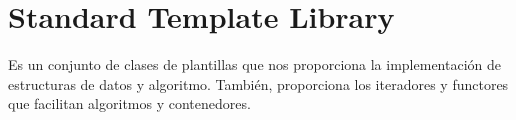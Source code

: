 \chapter{Standard Template Library}

Es un conjunto de clases de plantillas que nos proporciona la implementación de estructuras de datos y
algoritmo. También, proporciona los iteradores y functores que facilitan algoritmos y contenedores.


%
%
%

